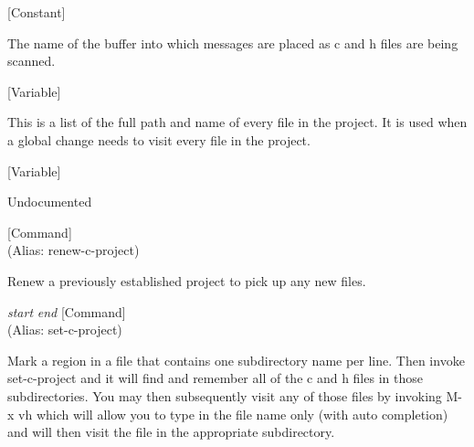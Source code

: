\vspace{1em}
\noindent
{}
\usebox{\funcname}
 \hfill [Constant]

\begin{doc-string}
The name of the buffer into which messages are placed as c and h files
are being scanned.
\end{doc-string}

\vspace{1em}
\noindent
{}
\usebox{\funcname}
 \hfill [Variable]

\begin{doc-string}
This is a list of the full path and name of every file in the project.
It is used when a global change needs to visit every file in the project.
\end{doc-string}

\vspace{1em}
\noindent
{}
\usebox{\funcname}
 \hfill [Variable]

\begin{doc-string}
Undocumented
\end{doc-string}

\vspace{1em}
\noindent
{}
\usebox{\funcname}
 \hfill [Command]\\%
 (Alias: renew-c-project)

\begin{doc-string}
Renew a previously established project to pick up any new files.
\end{doc-string}

\vspace{1em}
\noindent
{}
\usebox{\funcname}\emph{start} \emph{end}
 \hfill [Command]\\%
 (Alias: set-c-project)

\begin{doc-string}
Mark a region in a file that contains one subdirectory name per line.
Then invoke set-c-project and it will find and remember all of the c and h
files in those subdirectories.  You may then subsequently visit any of
those files by invoking M-x vh which will allow you to type in the file
name only (with auto completion) and will then visit the file in the
appropriate subdirectory.
\end{doc-string}

